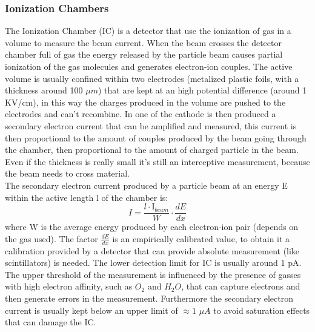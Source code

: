 \documentclass[12pt,a4paper]{report}
\begin{document}
	\subsubsection{Ionization Chambers}
	The Ionization Chamber (IC) is a detector that use the ionization of gas in a volume to measure the beam current. When the beam crosses the detector chamber full of gas the energy released by the particle beam causes partial ionization of the gas molecules and generates electron-ion couples. The active volume is usually confined within two electrodes (metalized plastic foils, with a thickness around 100 $\mu m$) that are kept at an high potential difference (around 1 KV/cm), in this way the charges produced in the volume are pushed to the electrodes and can't recombine. In one of the cathode is then produced a secondary electron current that can be amplified and measured, this current is then proportional to the amount of couples produced by the beam going through the chamber, then proportional to the amount of charged particle in the beam.
	Even if the thickness is really small it's still an interceptive measurement, because the beam needs to cross material.\\
	The secondary electron current produced by a particle beam at an energy E within the active length l of the chamber is:
	\begin{equation}
		I = \frac{l \cdot \text{I}_{beam}}{W} \cdot \frac{dE}{dx}
	\end{equation}
	where W is the average energy produced by each electron-ion pair (depends on the gas used). The factor $\frac{dE}{dx}$ is an empirically calibrated value, to obtain it a calibration provided by a detector that can provide absolute measurement (like scintillators) is needed.
	The lower detection limit for IC is usually around 1 pA. The upper threshold of the measurement is influenced by the presence of gasses with high electron affinity, such as $O_2$ and $H_2O$, that can capture electrons and then generate errors in the measurement. Furthermore the secondary electron current is usually kept below an upper limit of $\approx 1$ $\mu A$ to avoid saturation effects that can damage the IC.
\end{document}
